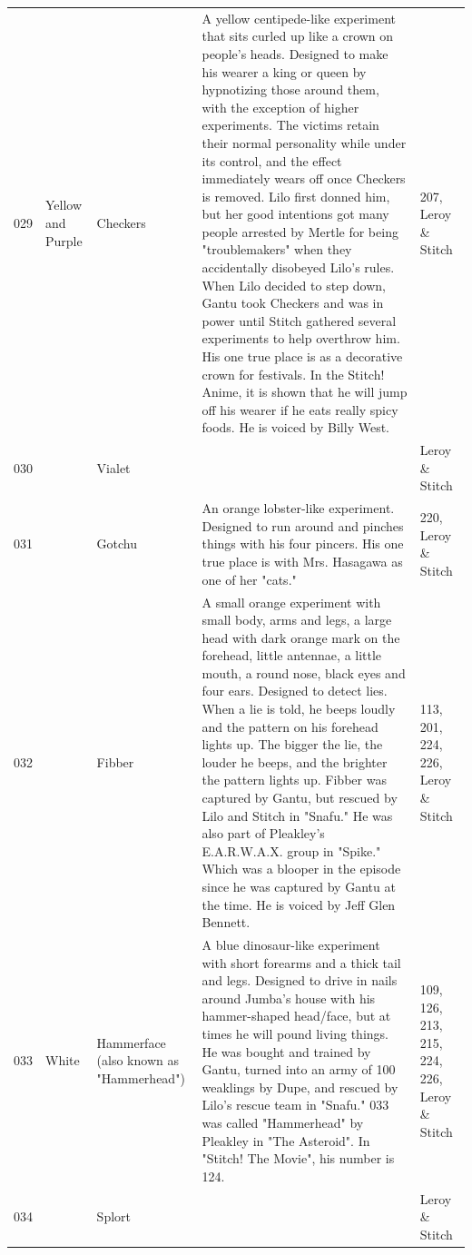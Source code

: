 \documentclass{article}
\begin{document}
\begin{tabular}{lllll}
029 & Yellow and Purple & Checkers & A yellow centipede-like experiment that sits curled up like a crown on people's heads. Designed to make his wearer a king or queen by hypnotizing those around them, with the exception of higher experiments. The victims retain their normal personality while under its control, and the effect immediately wears off once Checkers is removed. Lilo first donned him, but her good intentions got many people arrested by Mertle for being "troublemakers" when they accidentally disobeyed Lilo's rules. When Lilo decided to step down, Gantu took Checkers and was in power until Stitch gathered several experiments to help overthrow him. His one true place is as a decorative crown for festivals. In the Stitch! Anime, it is shown that he will jump off his wearer if he eats really spicy foods. He is voiced by Billy West. & 207, Leroy \& Stitch \\
030 &  & Vialet &  & Leroy \& Stitch \\
031 &  & Gotchu & An orange lobster-like experiment. Designed to run around and pinches things with his four pincers. His one true place is with Mrs. Hasagawa as one of her "cats." & 220, Leroy \& Stitch \\
032 &  & Fibber & A small orange experiment with small body, arms and legs, a large head with dark orange mark on the forehead, little antennae, a little mouth, a round nose, black eyes and four ears. Designed to detect lies. When a lie is told, he beeps loudly and the pattern on his forehead lights up. The bigger the lie, the louder he beeps, and the brighter the pattern lights up. Fibber was captured by Gantu, but rescued by Lilo and Stitch in "Snafu." He was also part of Pleakley's E.A.R.W.A.X. group in "Spike." Which was a blooper in the episode since he was captured by Gantu at the time. He is voiced by Jeff Glen Bennett. & 113, 201, 224, 226, Leroy \& Stitch \\
033 & White & Hammerface (also known as "Hammerhead") & A blue dinosaur-like experiment with short forearms and a thick tail and legs. Designed to drive in nails around Jumba's house with his hammer-shaped head/face, but at times he will pound living things. He was bought and trained by Gantu, turned into an army of 100 weaklings by Dupe, and rescued by Lilo's rescue team in "Snafu." 033 was called "Hammerhead" by Pleakley in "The Asteroid". In "Stitch! The Movie", his number is 124. & 109, 126, 213, 215, 224, 226, Leroy \& Stitch \\
034 &  & Splort &  & Leroy \& Stitch \\

\end{tabular}
\end{document}
